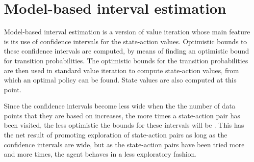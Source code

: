 \section{Model-based interval estimation}
\label{sec:mbie}
Model-based interval estimation is a version of value iteration whose main feature is its use of confidence intervals for the state-action values. Optimistic bounds to these confidence intervals are computed, by means of finding an optimistic bound for transition probabilities. The optimistic bounds for the transition probabilities are then used in standard value iteration to compute state-action values, from which an optimal policy can be found. State values are also computed at this point.

 Since the confidence intervals become less wide when the the number of data points that they are based on increases, the more times a state-action pair has been visited, the less optimistic the bounds for these intervals will be 
\parencite{dietterich2013pac}. This has the net result of promoting exploration of state-action pairs as long as the confidence intervals are wide, but as the state-action pairs have been tried more and more times, the agent behaves in a less exploratory fashion. 




\begin{comment}
Model-based interval estimation is a modification of value iteration whose main feature is its  addition of confidence
intervals to the state-action values. These confidence intervals allow the agent to choose between
actions, based on how confident it is about its evaluation of them. In effect,
the less certain the agent is about its evaluation of the states and actions,
the more exploratory the actions will be. When the agent is more confident
however, it will exploit what it has learned so far about the MDP
\parencite{dietterich2013pac}.
\end{comment}



